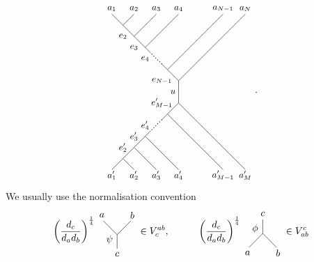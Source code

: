 	\begin{equation}
		\begin{tikzpicture}[scale=0.8,baseline=(current bounding box.center)]
			\draw (0,0) -- (0,0.5);
			\draw (0,0.5) -- (-0.5,1);
			\draw (-0.5,1) -- (-0.75,1.25);
			\draw[dotted,thick] (-0.75,1.25) -- (-1.25,1.75);
			\draw (-1.25,1.75) -- (-1.5,2);
			\draw (-1.5,2) -- (-2,2.5);
			\draw (-2,2.5) -- (-2.5,3);
			\draw (-2.5,3) -- (-3,3.5);
			\draw (0,0.5) -- (3,3.5);
			\draw (-0.5,1) -- (2,3.5);
			\draw (-1.5,2) -- (0,3.5);
			\draw (-2,2.5) -- (-1,3.5);
			\draw (-2.5,3) -- (-2,3.5);
			\node at (-0.25,0) {\small $u$};
			\node at (-0.75,0.5) {\small $e_{N-1}$};
			\node at (-2,2) {\small $e_3$};
			\node at (-2.5,2.5) {\small $e_2$};
			\node at (-1.5,1.5) {\small $e_4$};
			\node at (-3,3.75) {\small $a_1$};
			\node at (-2,3.75) {\small $a_2$};
			\node at (-1,3.75) {\small $a_3$};
			\node at (0,3.75) {\small $a_4$};
			\node at (2,3.75) {\small $a_{N-1}$};
			\node at (3,3.75) {\small $a_N$};
			\begin{scope}[yscale=-1]
			\draw (0,0) -- (0,0.5);
			\draw (0,0.5) -- (-0.5,1);
			\draw (-0.5,1) -- (-0.75,1.25);
			\draw[dotted,thick] (-0.75,1.25) -- (-1.25,1.75);
			\draw (-1.25,1.75) -- (-1.5,2);
			\draw (-1.5,2) -- (-2,2.5);
			\draw (-2,2.5) -- (-2.5,3);
			\draw (-2.5,3) -- (-3,3.5);
			\draw (0,0.5) -- (3,3.5);
			\draw (-0.5,1) -- (2,3.5);
			\draw (-1.5,2) -- (0,3.5);
			\draw (-2,2.5) -- (-1,3.5);
			\draw (-2.5,3) -- (-2,3.5);
			\node at (-0.75,0.5) {\small $e_{M-1}'$};
			\node at (-2,2) {\small $e_3'$};
			\node at (-2.5,2.5) {\small $e_2'$};
			\node at (-1.5,1.5) {\small $e_4'$};
			\node at (-3,3.75) {\small $a_1'$};
			\node at (-2,3.75) {\small $a_2'$};
			\node at (-1,3.75) {\small $a_3'$};
			\node at (0,3.75) {\small $a_4'$};
			\node at (2,3.75) {\small $a_{M-1}'$};
			\node at (3,3.75) {\small $a_M'$};
			\end{scope}
		\end{tikzpicture}.
	\end{equation}
We usually use the normalisation convention
	\begin{equation}
	\label{eq:vertexnorm}
		\left(\frac{d_c}{d_a d_b}\right)^\frac{1}{4}
		\begin{tikzpicture}[scale=0.5,baseline=(current bounding box.center),yscale=-1]
		\node at (-0.55,-0.65) {$\psi$};
		\draw (0,0) -- (0,-1);
		\draw (0,-1) -- (-1,-2);
		\draw (0,-1) -- (1,-2);
		\node at (0,0.4) {$c$};
		\node at (-1.1,-2.4) {$a$};
		\node at (1.1,-2.4) {$b$};
		\end{tikzpicture}\in V^{ab}_c,\hspace{30pt}
		\left(\frac{d_c}{d_a d_b}\right)^\frac{1}{4}
		\begin{tikzpicture}[scale=0.5,baseline=(current bounding box.center)]
		\node at (-0.55,-0.65) {$\phi$};
		\draw (0,0) -- (0,-1);
		\draw (0,-1) -- (-1,-2);
		\draw (0,-1) -- (1,-2);
		\node at (0,0.4) {$c$};
		\node at (-1.1,-2.4) {$a$};
		\node at (1.1,-2.4) {$b$};
		\end{tikzpicture}\in V_{ab}^c
	\end{equation}
